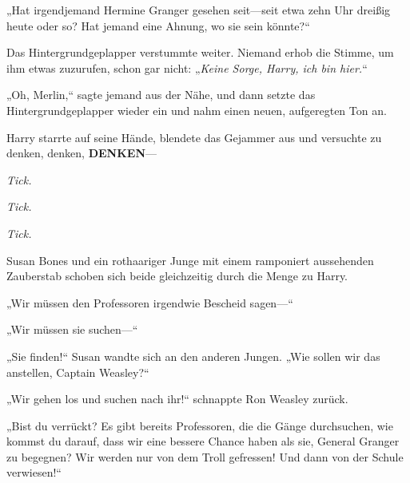 „Hat irgendjemand Hermine Granger gesehen seit—seit etwa zehn Uhr dreißig heute oder so? Hat jemand eine Ahnung, wo sie sein könnte?“


Das Hintergrundgeplapper verstummte weiter. Niemand erhob die Stimme, um ihm etwas zuzurufen, schon gar nicht: „\emph{Keine Sorge, Harry, ich bin hier.}“

„Oh, Merlin,“ sagte jemand aus der Nähe, und dann setzte das Hintergrundgeplapper wieder ein und nahm einen neuen, aufgeregten Ton an.

Harry starrte auf seine Hände, blendete das Gejammer aus und versuchte zu denken, denken, \textbf{DENKEN}—

\emph{Tick.}

\emph{Tick.}

\emph{Tick.}

Susan Bones und ein rothaariger Junge mit einem ramponiert aussehenden Zauberstab schoben sich beide gleichzeitig durch die Menge zu Harry.

„Wir müssen den Professoren irgendwie Bescheid sagen—“

„Wir müssen sie suchen—“

„Sie finden!“ Susan wandte sich an den anderen Jungen. „Wie sollen wir das anstellen, Captain Weasley?“

„Wir gehen los und suchen nach ihr!“ schnappte Ron Weasley zurück.

„Bist du verrückt? Es gibt bereits Professoren, die die Gänge durchsuchen, wie kommst du darauf, dass wir eine bessere Chance haben als sie, General Granger zu begegnen? Wir werden nur von dem Troll gefressen! Und dann von der Schule verwiesen!“


